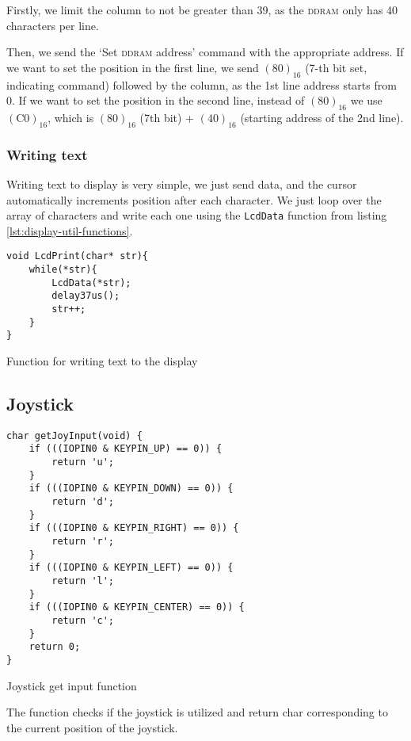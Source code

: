 \documentclass[10pt]{article}
\begin{document}
Firstly, we limit the column to not be greater than 39, as the \textsc{ddram} only has 40 characters per line.

Then, we send the `Set \textsc{ddram} address' command with the appropriate address.
If we want to set the position in the first line, we send $(80)_{16}$ (7-th bit set, indicating command) followed by the column, as the 1st line address starts from 0.
If we want to set the position in the second line, instead of $(80)_{16}$ we use $(\mathrm{C0})_{16}$, which is $(80)_{16}$ (7th bit) + $(40)_{16}$ (starting address of the 2nd line).

\subsubsection{Writing text}

Writing text to display is very simple, we just send data, and the cursor automatically increments position after each character.
We just loop over the array of characters and write each one using the \texttt{LcdData} function from listing \ref{lst:display-util-functions}.

\begin{program}[H]
	\begin{lstlisting}
void LcdPrint(char* str){
    while(*str){
        LcdData(*str);
        delay37us();
        str++;
    }
}
	\end{lstlisting}
	\caption{Function for writing text to the display}
\end{program}
    
\subsection{Joystick}

\begin{program}
	\begin{lstlisting}
char getJoyInput(void) {
    if (((IOPIN0 & KEYPIN_UP) == 0)) {
        return 'u';
    }
    if (((IOPIN0 & KEYPIN_DOWN) == 0)) {
        return 'd';
    }
    if (((IOPIN0 & KEYPIN_RIGHT) == 0)) {
        return 'r';
    }
    if (((IOPIN0 & KEYPIN_LEFT) == 0)) {
        return 'l';
    }
    if (((IOPIN0 & KEYPIN_CENTER) == 0)) {
        return 'c';
    }
    return 0;
}
	\end{lstlisting}
	\caption{Joystick get input function}
\end{program}
The function checks if the joystick is utilized and return char corresponding to the current position of the joystick.
\end{document}
